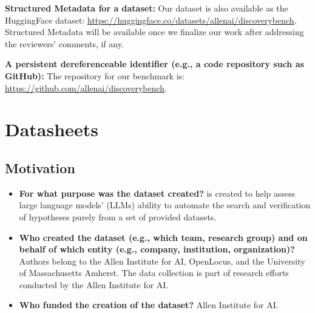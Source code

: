 \begin{enumerate}
    \textbf{Structured Metadata for a dataset:} Our dataset is also available as the HuggingFace dataset: \url{https://huggingface.co/datasets/allenai/discoverybench}. Structured Metadata will be available once we finalize our work after addressing the reviewers' comments, if any.

    \textbf{A persistent dereferenceable identifier (e.g., a code repository such as GitHub):} The repository for our benchmark is: \url{https://github.com/allenai/discoverybench}.

\end{enumerate}

\section{Datasheets}
\label{sec:datasheets}

\subsection{Motivation}

\begin{itemize}
    \item \textbf{For what purpose was the dataset created?} \discoverybench{} is created to help assess large language models' (LLMs) ability to automate the search and verification of hypotheses purely from a set of provided datasets.
    \item \textbf{Who created the dataset (e.g., which team, research group) and on behalf of which entity (e.g., company, institution, organization)?} Authors belong to the Allen Institute for AI, OpenLocus, and the University of Massachusetts Amherst. The data collection is part of research efforts conducted by the Allen Institute for AI.
    \item \textbf{Who funded the creation of the dataset?} Allen Institute for AI.
\end{itemize}


